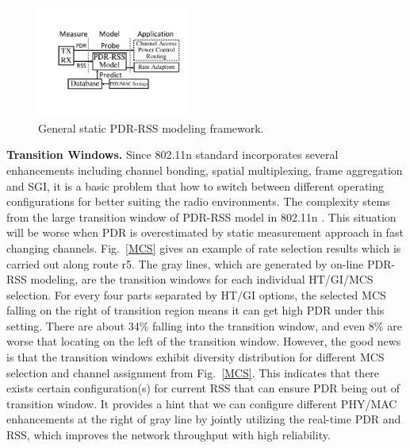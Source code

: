 \documentclass[journal,onecolumn,12pt]{IEEEtran}
\begin{document}
\begin{figure}[!t]
\centering
\includegraphics[width=0.45\textwidth]{modeling1.pdf}
\caption{General static PDR-RSS modeling framework.}
\label{offlinemodel}
\end{figure}

\textbf{Transition Windows.} Since 802.11n standard incorporates several enhancements including channel bonding, spatial multiplexing, frame aggregation and SGI, it is a basic problem that how to switch between different operating configurations for better suiting the radio environments. The complexity stems from the large transition window of PDR-RSS model in 802.11n \cite{Halperin2010predictable}. This situation will be worse when PDR is overestimated by static measurement approach in fast changing channels. Fig.~\ref{MCS} gives an example of rate selection results which is carried out along route r5. The gray lines, which are generated by on-line PDR-RSS modeling, are the transition windows for each individual HT/GI/MCS selection. For every four parts separated by HT/GI options, the selected MCS falling on the right of transition region means it can get high PDR under this setting. There are about 34\% falling into the transition window, and even 8\% are worse that locating on the left of the transition window. However, the good news is that the transition windows exhibit diversity distribution for different MCS selection and channel assignment from Fig.~\ref{MCS}. This indicates that there exists certain configuration(s) for current RSS that can ensure PDR being out of transition window. It provides a hint that we can configure different PHY/MAC enhancements at the right of gray line by jointly utilizing the real-time PDR and RSS, which improves the network throughput with high reliability.
\end{document}
